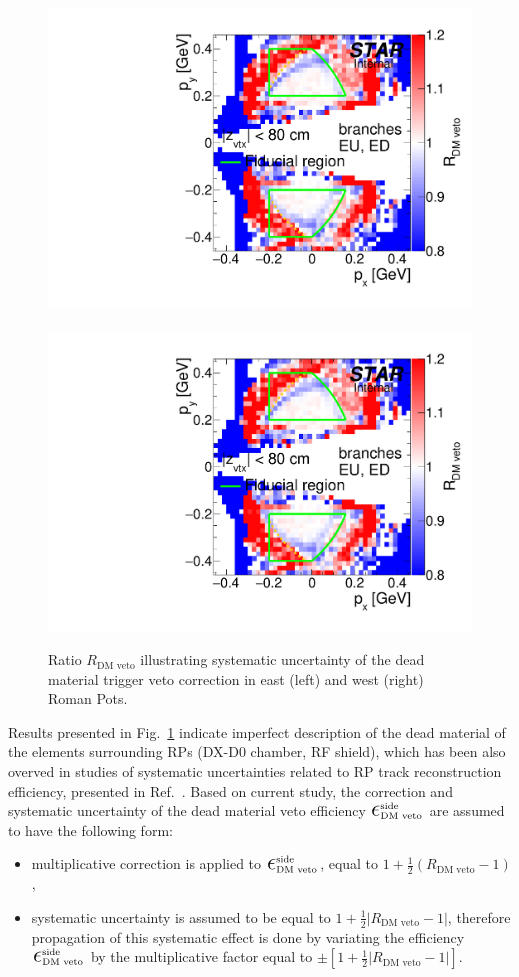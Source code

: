 \begin{figure}[h]
\centering
\includegraphics[width=.48\textwidth,page=1]{graphics/systematics/deadMatSyst.pdf}~~~~%
\includegraphics[width=.48\textwidth,page=2]{graphics/systematics/deadMatSyst.pdf}%
\caption[Estimated systematic uncertainty related to trigger veto induced by interaction with dead material.]{Ratio $R_{\text{DM~veto}}$ illustrating systematic uncertainty of the dead material trigger veto correction in east (left) and west (right) Roman Pots.}
\label{fig:systDMveto}
\end{figure}

Results presented in Fig.~\ref{fig:systDMveto} indicate imperfect description of the dead material of the elements surrounding RPs (DX-D0 chamber, RF shield), which has been also overved in studies of systematic uncertainties related to RP track reconstruction efficiency, presented in Ref.~\cite{supplementaryNote}. Based on current study, the correction and systematic uncertainty of the dead material veto efficiency $\mbox{\LARGE$\epsilon$}_{\text{DM~veto}}^{\text{side}}$ are assumed to have the following form: 
\begin{itemize}
\item multiplicative correction is applied to $\mbox{\LARGE$\epsilon$}_{\text{DM~veto}}^{\text{side}}$, equal to $1+\frac{1}{2}(R_{\text{DM~veto}}-1)$,
 \item systematic uncertainty is assumed to be equal to $1+\frac{1}{2}|R_{\text{DM~veto}}-1|$, therefore propagation of this systematic effect is done by variating the efficiency $\mbox{\LARGE$\epsilon$}_{\text{DM~veto}}^{\text{side}}$ by the multiplicative factor equal to $\pm\left[1+\frac{1}{2}|R_{\text{DM~veto}}-1|\right]$. 
\end{itemize} 



